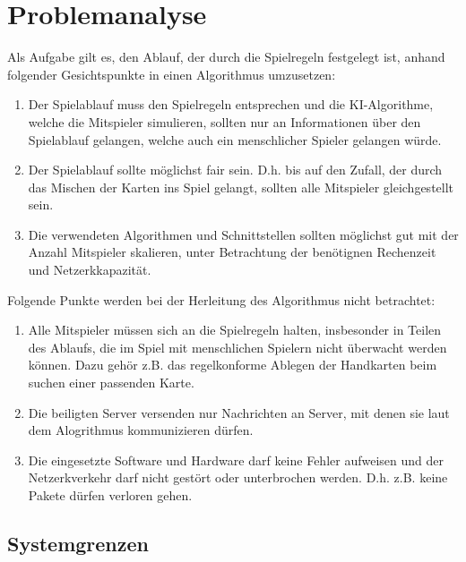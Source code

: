 \section{Problemanalyse}   %


Als Aufgabe gilt es, den Ablauf, der durch die Spielregeln festgelegt ist, anhand folgender Gesichtspunkte in einen Algorithmus umzusetzen:


\begin{enumerate}
	\item Der Spielablauf muss den Spielregeln entsprechen und die KI-Algorithme, welche die Mitspieler simulieren, sollten nur an Informationen über den Spielablauf gelangen, welche auch ein menschlicher Spieler gelangen würde.
	\item Der Spielablauf sollte möglichst fair sein. D.h. bis auf den Zufall, der durch das Mischen der Karten ins Spiel gelangt, sollten alle Mitspieler gleichgestellt sein.
	\item Die verwendeten Algorithmen und Schnittstellen sollten möglichst gut mit der Anzahl Mitspieler skalieren, unter Betrachtung der benötignen Rechenzeit und Netzerkkapazität.
\end{enumerate}

Folgende Punkte werden bei der Herleitung des Algorithmus nicht betrachtet:

\begin{enumerate}
	\item Alle Mitspieler müssen sich an die Spielregeln halten, insbesonder in Teilen des Ablaufs, die im Spiel mit menschlichen Spielern nicht überwacht werden können. Dazu gehör z.B. das regelkonforme Ablegen der Handkarten beim suchen einer passenden Karte.
	\item Die beiligten Server versenden nur Nachrichten an Server, mit denen sie laut dem Alogrithmus kommunizieren dürfen.
	\item Die eingesetzte Software und Hardware darf keine Fehler aufweisen und der Netzerkverkehr darf nicht gestört oder unterbrochen werden. D.h. z.B. keine Pakete dürfen verloren gehen.
\end{enumerate}


\subsection{Systemgrenzen}

